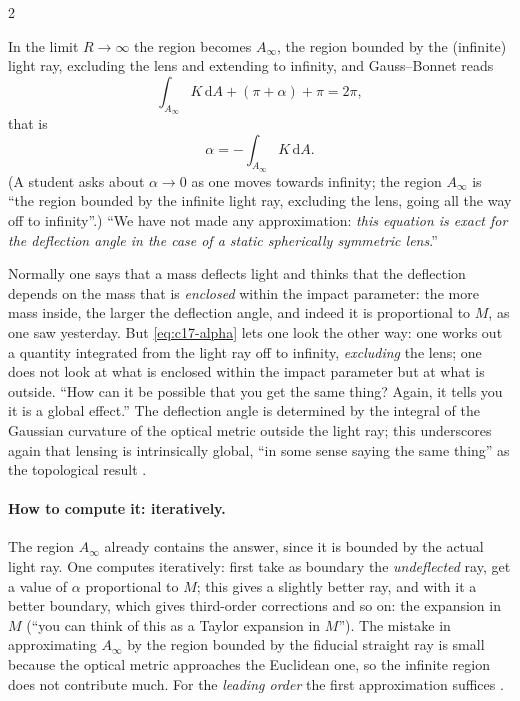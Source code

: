 \begin{paracol}{2}
\begin{enumerate}
\end{enumerate}
In the limit $R\to\infty$ the region becomes $A_\infty$, the region bounded by the (infinite) light ray, excluding the lens and extending to infinity, and Gauss--Bonnet reads
\[
  \int_{A_\infty}K\,\mathrm dA+(\pi+\alpha)+\pi=2\pi,
\]
that is
\begin{equation}\label{eq:c17-alpha}
  \alpha=-\int_{A_\infty}K\,\mathrm dA.
\end{equation}
(A student asks about $\alpha\to0$ as one moves towards infinity; the region $A_\infty$ is ``the region bounded by the infinite light ray, excluding the lens, going all the way off to infinity''.) ``We have not made any approximation: \emph{this equation is exact for the deflection angle in the case of a static spherically symmetric lens}.'' 

\begin{remark}\label{rem:c17-global}
Normally one says that a mass deflects light and thinks that the deflection depends on the mass that is \emph{enclosed} within the impact parameter: the more mass inside, the larger the deflection angle, and indeed it is proportional to $M$, as one saw yesterday. But \eqref{eq:c17-alpha} lets one look the other way: one works out a quantity integrated from the light ray off to infinity, \emph{excluding} the lens; one does not look at what is enclosed within the impact parameter but at what is outside. ``How can it be possible that you get the same thing? Again, it tells you it is a global effect.'' The deflection angle is determined by the integral of the Gaussian curvature of the optical metric outside the light ray; this underscores again that lensing is intrinsically global, ``in some sense saying the same thing'' as the topological result .
\end{remark}

\paragraph{How to compute it: iteratively.} The region $A_\infty$ already contains the answer, since it is bounded by the actual light ray. One computes iteratively: first take as boundary the \emph{undeflected} ray, get a value of $\alpha$ proportional to $M$; this gives a slightly better ray, and with it a better boundary, which gives third-order corrections and so on: the expansion in $M$ (``you can think of this as a Taylor expansion in $M$''). The mistake in approximating $A_\infty$ by the region bounded by the fiducial straight ray is small because the optical metric approaches the Euclidean one, so the infinite region does not contribute much. For the \emph{leading order} the first approximation suffices .


\end{paracol}
